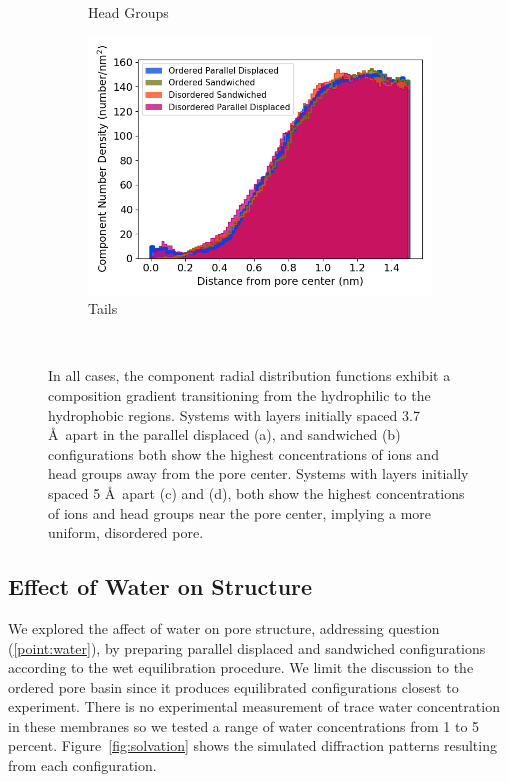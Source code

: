 \documentclass[journal=jpcbfk,manusciprt=article]{achemso}
\begin{document}
\begin{figure}
\begin{subfigure}{0.5\textwidth}
        \caption{Head Groups}
        \label{fig:head_groups_regional_density}
  \end{subfigure}
  \begin{subfigure}{0.5\textwidth}
        \includegraphics[width=1\linewidth]{tails_density.png}
        \caption{Tails}
        \label{fig:tails_regional_density}
  \end{subfigure}
  \caption{In all cases, the component radial distribution functions exhibit a
	  composition gradient transitioning from the hydrophilic to the hydrophobic
	  regions. Systems with layers initially spaced 3.7 \AA~apart in the  parallel
	  displaced (a), and sandwiched (b) configurations both show the highest
	  concentrations of ions and head groups away from the pore center. Systems with
	  layers initially spaced 5 \AA~apart (c) and (d), both show the highest
	  concentrations of ions and head groups near the pore center, implying a more
	  uniform, disordered pore.}~\label{fig:overlaid_densities}
  \end{figure}

  \subsection{Effect of Water on Structure}\label{section:water}

  We explored the affect of water on pore structure, addressing question
  (\ref{point:water}), by preparing parallel displaced and sandwiched
  configurations according to the wet equilibration procedure. We limit
  the discussion to the ordered pore basin since it produces equilibrated 
  configurations closest to experiment. There is no experimental measurement
  of trace water concentration in these membranes so we tested
  a range of water concentrations from 1 to 5 percent. Figure~\ref{fig:solvation}
  shows the simulated diffraction patterns resulting from each configuration.
  
\end{document}
